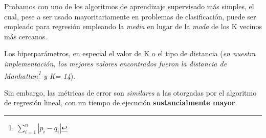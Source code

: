Probamos con uno de los algoritmos de aprendizaje supervisado más simples, el cual, pese a ser usado mayoritariamente en problemas de clasificación, puede ser empleado para regresión empleando la \textit{media} en lugar de la \textit{moda} de los K vecinos más cercanos.

Los hiperparámetros, en especial el valor de K o el tipo de distancia (\textit{en nuestra implementación, los mejores valores encontrados fueron la distancia de Manhattan\footnote{\(\sum_{i=1}^{n} |p_{i} - q_{i}|\)} y K= 14}).

Sin embargo, las métricas de error son \textit{similares} a las otorgadas por el algoritmo de regresión lineal, con un tiempo de ejecución \textbf{sustancialmente mayor}.








 